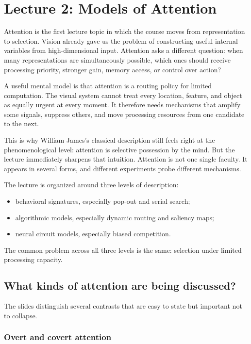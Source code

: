 \section{Lecture 2: Models of Attention}

Attention is the first lecture topic in which the course moves from representation to selection. Vision already gave us the problem of constructing useful internal variables from high-dimensional input. Attention asks a different question: when many representations are simultaneously possible, which ones should receive processing priority, stronger gain, memory access, or control over action?

A useful mental model is that attention is a routing policy for limited computation. The visual system cannot treat every location, feature, and object as equally urgent at every moment. It therefore needs mechanisms that amplify some signals, suppress others, and move processing resources from one candidate to the next.

This is why William James's classical description still feels right at the phenomenological level: attention is selective possession by the mind. But the lecture immediately sharpens that intuition. Attention is not one single faculty. It appears in several forms, and different experiments probe different mechanisms.

The lecture is organized around three levels of description:
\begin{itemize}
    \item behavioral signatures, especially pop-out and serial search;
    \item algorithmic models, especially dynamic routing and saliency maps;
    \item neural circuit models, especially biased competition.
\end{itemize}

The common problem across all three levels is the same: selection under limited processing capacity.

\subsection{What kinds of attention are being discussed?}

The slides distinguish several contrasts that are easy to state but important not to collapse.

\subsubsection{Overt and covert attention}


